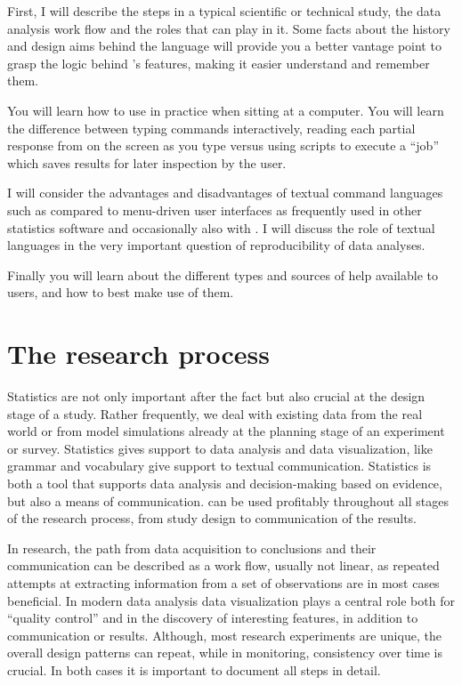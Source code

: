 \documentclass[krantz2]{krantz}\usepackage{knitr}
\begin{document}
First, I will describe the steps in a typical scientific or technical study, the data analysis work flow and the roles that \Rpgrm can play in it. Some facts about the history and design aims behind the \Rlang language will provide you a better vantage point to grasp the logic behind \Rlang's features, making it easier understand and remember them.

You will learn how to use \Rlang in practice when sitting at a computer. You will learn the difference between typing commands interactively, reading each partial response from \Rlang on the screen as you type versus using \Rlang scripts to execute a ``job'' which saves results for later inspection by the user.

I will consider the advantages and disadvantages of textual command languages such as \Rlang compared to menu-driven user interfaces as frequently used in other statistics software and occasionally also with \Rlang. I will discuss the role of textual languages in the very important question of reproducibility of data analyses.

Finally you will learn about the different types and sources of help available to \Rlang users, and how to best make use of them.

\section{The research process}

Statistics are not only important after the fact but also crucial at the design stage of a study. Rather frequently, we deal with existing data from the real world or from model simulations already at the planning stage of an experiment or survey. Statistics gives support to data analysis and data visualization, like grammar and vocabulary give support to textual communication. Statistics is both a tool that supports data analysis and decision-making based on evidence, but also a means of communication. \Rlang can be used profitably throughout all stages of the research process, from study design to communication of the results.

In research, the path from data acquisition to conclusions and their communication can be described as a work flow, usually not linear, as repeated attempts at extracting information from a set of observations are in most cases beneficial. In modern data analysis data visualization plays a central role both for ``quality control'' and in the discovery of interesting features, in addition to communication or results. Although, most research experiments are unique, the overall design patterns can repeat, while in monitoring, consistency over time is crucial. In both cases it is important to document all steps in detail.
\end{document}

